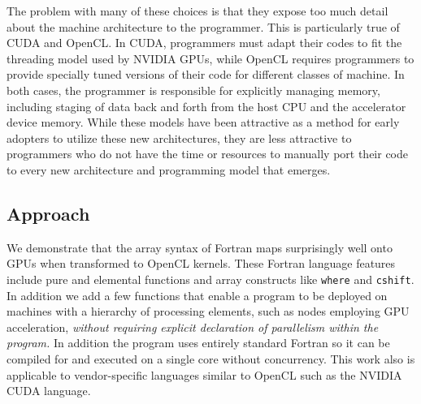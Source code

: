 
The problem with many of these choices is that they expose too much
detail about the machine architecture to the programmer.  This is
particularly true of CUDA and OpenCL.  In CUDA, programmers must adapt
their codes to fit the threading model used by NVIDIA GPUs, while
OpenCL requires programmers to provide specially tuned versions of
their code for different classes of machine.  In both cases, the
programmer is responsible for explicitly managing memory,
including staging of data back and forth from the host CPU and the
accelerator device memory.  While these models have been attractive as
a method for early adopters to utilize these new architectures, they
are less attractive to programmers who do not have the time or
resources to manually port their code to every new architecture and
programming model that emerges.


\subsection{Approach}


We demonstrate that the array syntax of Fortran maps surprisingly well
onto GPUs when transformed to OpenCL kernels.  These Fortran language
features include pure and elemental functions and array constructs
like {\tt where} and {\tt cshift}.  In addition we add a few functions
that enable a program to be deployed on machines with a hierarchy of
processing elements, such as nodes employing GPU acceleration,
\emph{without requiring explicit declaration of parallelism within the
  program.}  In addition the program uses entirely standard Fortran so
it can be compiled for and executed on a single core without concurrency.
This work also is applicable to vendor-specific languages similar to
OpenCL such as the NVIDIA CUDA language.

